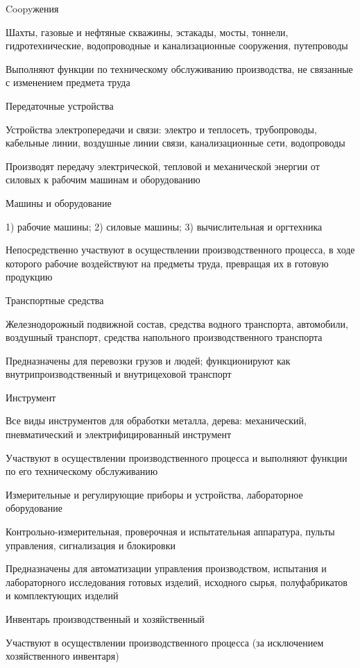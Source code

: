 Coopyжения

Шахты, газовые и нефтяные скважины, эстакады, мосты, тоннели, гидротехнические,
водопроводные и канализационные сооружения, путепроводы

Выполняют функции по техническому обслуживанию производства, не связанные с
изменением предмета труда

Передаточные устройства

Устройства электропередачи и связи: электро и теплосеть, трубопроводы, кабельные
линии, воздушные линии связи, канализационные сети, водопроводы

Производят передачу электрической, тепловой и механической энергии от силовых к
рабочим машинам и оборудованию

Машины и оборудование

1) рабочие машины; 2) силовые машины; 3) вычислительная и оргтехника

Непосредственно участвуют в осуществлении производственного процесса, в ходе
которого рабочие воздействуют на предметы труда, превращая их в готовую
продукцию

Транспортные средства

Железнодорожный подвижной состав, средства водного транспорта, автомобили,
воздушный транспорт, средства напольного производственного транспорта

Предназначены для перевозки грузов и людей; функционируют как
внутрипроизводственный и внутрицеховой транспорт

Инструмент

Все виды инструментов для обработки металла, дерева: механический,
пневматический и электрифицированный инструмент

Участвуют в осуществлении производственного процесса и выполняют функции по его
техническому обслуживанию

Измерительные и регулирующие приборы и устройства, лабораторное оборудование

Контрольно-измерительная, проверочная и испытательная аппаратура, пульты
управления, сигнализация и блокировки

Предназначены для автоматизации управления производством, испытания и
лабораторного исследования готовых изделий, исходного сырья, полуфабрикатов и
комплектующих изделий

Инвентарь производственный и хозяйственный

Участвуют в осуществлении производственного процесса (за исключением
хозяйственного инвентаря)

